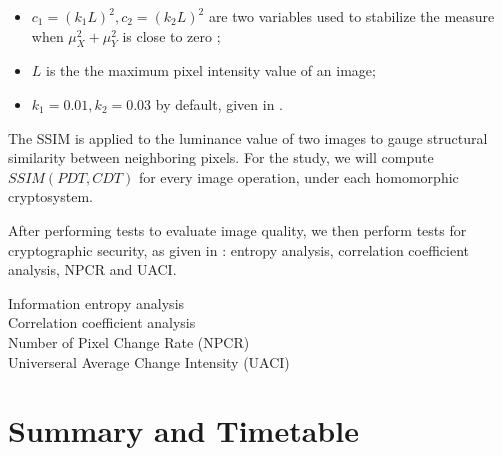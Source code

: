 \begin{description}
\begin{itemize}
		\item $c_1 = (k_1L)^2, c_2 = (k_2L)^2$ are two variables used to stabilize the measure when $\mu_X^2+\mu_Y^2$ is close to zero \cite{akramullah_video_2014};
		\item $L$ is the the maximum pixel intensity value of an image;
		\item $k_1 = 0.01, k_2 = 0.03$ by default, given in \cite{ahmed_benchmark_2016}.
	\end{itemize}
	The SSIM is applied to the luminance value of two images to gauge structural similarity between neighboring pixels.
	For the study, we will compute $SSIM(PDT, CDT)$ for every image operation, under each homomorphic cryptosystem.
\end{description}

After performing tests to evaluate image quality, we then perform tests for cryptographic security, as given in \cite{ahmed_benchmark_2016}: entropy analysis, correlation coefficient analysis, NPCR and UACI.
\begin{description}
	\item [Information entropy analysis]
	\item [Correlation coefficient analysis]
	\item [Number of Pixel Change Rate (NPCR)]
	\item [Universeral Average Change Intensity (UACI)]
\end{description}

\section{Summary and Timetable}

